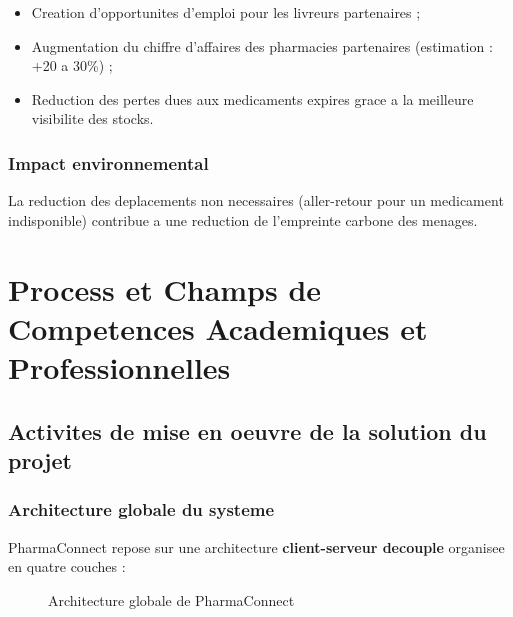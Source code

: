 \documentclass[12pt,a4paper]{report}
\begin{document}
\begin{itemize}[label=\textcolor{vertpharma}{\textbullet}]
    \item Creation d'opportunites d'emploi pour les livreurs partenaires ;
    \item Augmentation du chiffre d'affaires des pharmacies partenaires (estimation : +20 a 30\%) ;
    \item Reduction des pertes dues aux medicaments expires grace a la meilleure visibilite des stocks.
\end{itemize}

\subsection{Impact environnemental}

La reduction des deplacements non necessaires (aller-retour pour un medicament indisponible) contribue a une reduction de l'empreinte carbone des menages.

\chapter{Process et Champs de Competences Academiques et Professionnelles}

\section{Activites de mise en oeuvre de la solution du projet}

\subsection{Architecture globale du systeme}

PharmaConnect repose sur une architecture \textbf{client-serveur decouple} organisee en quatre couches :

\begin{figure}[ht]
\centering
{}
\caption{Architecture globale de PharmaConnect}
\end{figure}
\end{document}
